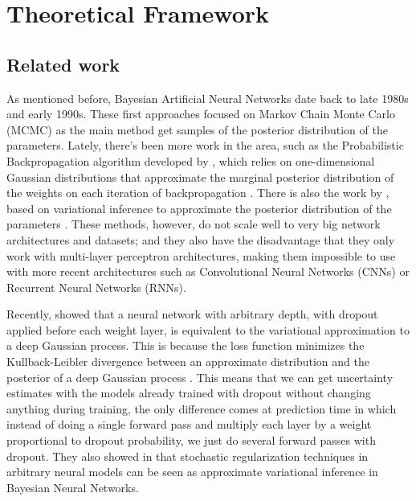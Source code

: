 
\chapter{Theoretical Framework}
\label{ch:theory}


\section{Related work}

As mentioned before, Bayesian Artificial Neural Networks date back to late 1980s and early 1990s. These first approaches focused on Markov Chain Monte Carlo (MCMC) as the main method get samples of the posterior distribution of the parameters. Lately, there's been more work in the area, such as the Probabilistic Backpropagation algorithm developed by \citeauthor{hernandez2015probabilistic}, which relies on one-dimensional Gaussian distributions that approximate the marginal posterior distribution of the weights on each iteration of backpropagation \cite{hernandez2015probabilistic}. There is also the work by \citeauthor{graves2011practical}, based on variational inference to approximate the posterior distribution of the parameters \cite{graves2011practical}. These methods, however, do not scale well to very big network architectures and datasets; and they also have the disadvantage that they only work with multi-layer perceptron architectures, making them impossible to use with more recent architectures such as Convolutional Neural Networks (CNNs) or Recurrent Neural Networks (RNNs).

Recently, \citeauthor{gal2015dropout1} showed that a neural network with arbitrary depth, with dropout applied before each weight layer, is equivalent to the variational approximation to a deep Gaussian process. This is because the loss function minimizes the Kullback-Leibler divergence between an approximate distribution and the posterior of a deep Gaussian process \cite{gal2015dropout1}. This means that we can get uncertainty estimates with the models already trained with dropout without changing anything during training, the only difference comes at prediction time in which instead of doing a single forward pass and multiply each layer by a weight proportional to dropout probability, we just do several forward passes with dropout. They also showed in \cite{gal2015modern} that stochastic regularization techniques in arbitrary neural models can be seen as approximate variational inference in Bayesian Neural Networks.

